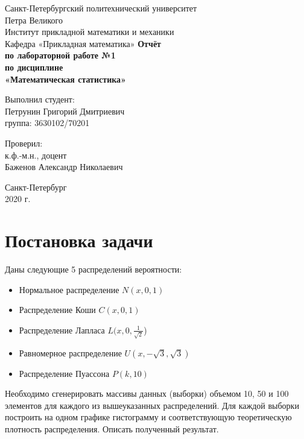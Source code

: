 \documentclass[12pt,a4paper]{article}
\begin{document}
	\begin{titlepage}
		\begin{center}		
			\vfill	
			Санкт-Петербургский политехнический университет \\
			Петра Великого\\
			\vskip 1cm
			Институт прикладной математики и механики \\
			Кафедра «Прикладная математика»
			\vfill
			\textbf{Отчёт\\
			по лабораторной работе №1\\
			по дисциплине\\
			«Математическая статистика»\\}
			\vfill
		\end{center}
		\vfill
		\hfill
		\begin{minipage}{0.4\textwidth}
			Выполнил студент:\\
			Петрунин Григорий Дмитриевич\\
			группа: 3630102/70201\\
		\end{minipage}
		\vfill
		\hfill 
		\begin{minipage}{0.4\textwidth}
			Проверил:\\
			к.ф.-м.н., доцент\\
			Баженов Александр Николаевич\
		\end{minipage}
		\vfill

		
		\begin{center}
			Санкт-Петербург\\2020 г.
		\end{center}
	\end{titlepage}

	\tableofcontents
	\listoffigures
	
	\newpage
	\section{Постановка задачи}
	Даны следующие 5 распределений вероятности:
	\begin{itemize}
		\item Нормальное распределение $\displaystyle N(x, 0, 1)$
		\item Распределение Коши $\displaystyle C(x, 0, 1)$
		\item Распределение Лапласа $\displaystyle L(x, 0, \frac{1}{\sqrt{2}}$)
		\item Равномерное распределение $\displaystyle U(x, -\sqrt{3}, \sqrt{3})$
		\item Распределение Пуассона $\displaystyle P(k, 10)$
	\end{itemize}
	Необходимо сгенерировать массивы данных (выборки) объемом 10, 50 и 100 элементов для каждого из вышеуказанных распределений. Для каждой выборки построить на одном графике гистограмму и соответствующую теоретическую плотность распределения. Описать полученный результат.
\end{document}
